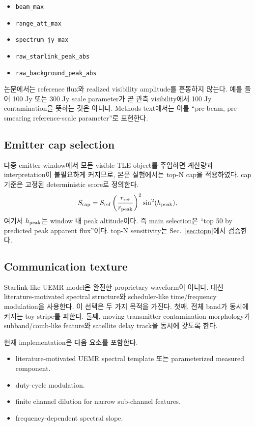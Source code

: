 \documentclass[11pt,a4paper]{article}
\begin{document}
\begin{itemize}
  \item \texttt{beam\_max}
  \item \texttt{range\_att\_max}
  \item \texttt{spectrum\_jy\_max}
  \item \texttt{raw\_starlink\_peak\_abs}
  \item \texttt{raw\_background\_peak\_abs}
\end{itemize}

논문에서는 reference flux와 realized visibility amplitude를 혼동하지 않는다.
예를 들어 100 Jy 또는 300 Jy scale parameter가 곧 관측 visibility에서 100 Jy contamination을 뜻하는 것은 아니다.
Methods text에서는 이를 ``pre-beam, pre-smearing reference-scale parameter''로 표현한다.

\subsection{Emitter cap selection}

다중 emitter window에서 모든 visible TLE object를 주입하면 계산량과 interpretation이 불필요하게 커지므로, 본문 실험에서는 top-N cap을 적용하였다.
cap 기준은 고정된 deterministic score로 정의한다.
\begin{equation}
  S_{\rm cap}
  =
  S_{\rm ref}
  \left(\frac{r_{\rm ref}}{r_{\rm peak}}\right)^2
  \sin^2(h_{\rm peak}),
\end{equation}
여기서 $h_{\rm peak}$는 window 내 peak altitude이다.
즉 main selection은 ``top 50 by predicted peak apparent flux''이다.
top-N sensitivity는 Sec.~\ref{sec:topn}에서 검증한다.

\subsection{Communication texture}

Starlink-like UEMR model은 완전한 proprietary waveform이 아니다.
대신 literature-motivated spectral structure와 scheduler-like time/frequency modulation을 사용한다.
이 선택은 두 가지 목적을 가진다.
첫째, 전체 band가 동시에 켜지는 toy stripe를 피한다.
둘째, moving transmitter contamination morphology가 subband/comb-like feature와 satellite delay track을 동시에 갖도록 한다.

현재 implementation은 다음 요소를 포함한다.
\begin{itemize}
  \item literature-motivated UEMR spectral template 또는 parameterized measured component.
  \item duty-cycle modulation.
  \item finite channel dilution for narrow sub-channel features.
  \item frequency-dependent spectral slope.
\end{itemize}
\end{document}
